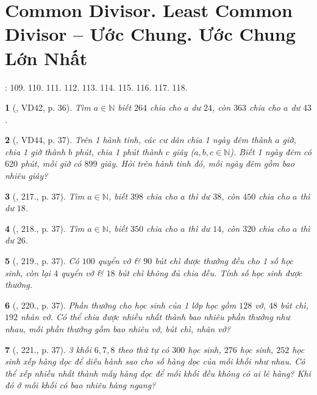 \documentclass{article}
\newtheorem{baitoan}{}
\begin{document}

\section{Common Divisor. Least Common Divisor -- Ước Chung. Ước Chung Lớn Nhất}
\cite[\S12, pp. 33--34]{SBT_Toan_6_Canh_Dieu_tap_1}: 109. 110. 111. 112. 113. 114. 115. 116. 117. 118.

\begin{baitoan}[\cite{Binh_Toan_6_tap_1}, VD42, p. 36]
	Tìm $a\in\mathbb{N}$ biết $264$ chia cho $a$ dư $24$, còn $363$ chia cho $a$ dư $43$.
\end{baitoan}

\begin{baitoan}[\cite{Binh_Toan_6_tap_1}, VD44, p. 37]
	Trên 1 hành tinh, các cư dân chia 1 ngày đêm thành $a$ giờ, chia 1 giờ thành $b$ phút, chia 1 phút thành $c$ giây ($a,b,c\in\mathbb{N}$). Biết 1 ngày đêm có $620$ phút, mỗi giờ có $899$ giây. Hỏi trên hành tinh đó, mỗi ngày đêm gồm bao nhiêu giây?
\end{baitoan}

\begin{baitoan}[\cite{Binh_Toan_6_tap_1}, 217., p. 37]
	Tìm $a\in\mathbb{N}$, biết $398$ chia cho $a$ thì dư $38$, còn $450$ chia cho $a$ thì dư $18$.
\end{baitoan}

\begin{baitoan}[\cite{Binh_Toan_6_tap_1}, 218., p. 37]
	Tìm $a\in\mathbb{N}$, biết $350$ chia cho $a$ thì dư $14$, còn $320$ chia cho $a$ thì dư $26$.
\end{baitoan}

\begin{baitoan}[\cite{Binh_Toan_6_tap_1}, 219., p. 37]
	Có $100$ quyển vở \& $90$ bút chì được thưởng đều cho 1 số học sinh, còn lại $4$ quyển vở \& $18$ bút chì không đủ chia đều. Tính số học sinh được thưởng.
\end{baitoan}

\begin{baitoan}[\cite{Binh_Toan_6_tap_1}, 220., p. 37]
	Phần thưởng cho học sinh của 1 lớp học gồm $128$ vở, $48$ bút chì, $192$ nhãn vở. Có thể chia được nhiều nhất thành bao nhiêu phần thưởng như nhau, mỗi phần thưởng gồm bao nhiêu vở, bút chì, nhãn vở?
\end{baitoan}

\begin{baitoan}[\cite{Binh_Toan_6_tap_1}, 221., p. 37]
	3 khối $6,7,8$ theo thứ tự có $300$ học sinh, $276$ học sinh, $252$ học sinh xếp hàng dọc để diễu hành sao cho số hàng dọc của mỗi khối như nhau. Có thể xếp nhiều nhất thành mấy hàng dọc để mỗi khối đều không có ai lẻ hàng? Khi đó ở mỗi khối có bao nhiêu hàng ngang?
\end{baitoan}
\end{document}
